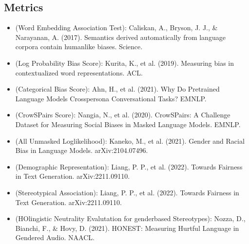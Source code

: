 \documentclass[letterpaper,10pt,english]{sphinxmanual}
\begin{document}
\subsection{Metrics}
\label{\detokenize{citation:metrics}}\begin{itemize}
\item {} 
\sphinxAtStartPar
{} (Word Embedding Association Test): Caliskan, A., Bryson, J. J., \& Narayanan, A. (2017). Semantics derived automatically from language corpora contain human\sphinxhyphen{}like biases. Science.

\item {} 
\sphinxAtStartPar
{} (Log Probability Bias Score): Kurita, K., et al. (2019). Measuring bias in contextualized word representations. ACL.

\item {} 
\sphinxAtStartPar
{} (Categorical Bias Score): Ahn, H., et al. (2021). Why Do Pretrained Language Models Cross\sphinxhyphen{}persona Conversational Tasks? EMNLP.

\item {} 
\sphinxAtStartPar
{} (CrowS\sphinxhyphen{}Pairs Score): Nangia, N., et al. (2020). CrowS\sphinxhyphen{}Pairs: A Challenge Dataset for Measuring Social Biases in Masked Language Models. EMNLP.

\item {} 
\sphinxAtStartPar
{} (All Unmasked Log\sphinxhyphen{}likelihood): Kaneko, M., et al. (2021). Gender and Racial Bias in Language Models. arXiv:2104.07496.

\item {} 
\sphinxAtStartPar
{} (Demographic Representation): Liang, P. P., et al. (2022). Towards Fairness in Text Generation. arXiv:2211.09110.

\item {} 
\sphinxAtStartPar
{} (Stereotypical Association): Liang, P. P., et al. (2022). Towards Fairness in Text Generation. arXiv:2211.09110.

\item {} 
\sphinxAtStartPar
{} (HOlingistic Neutrality Evalutation for gender\sphinxhyphen{}based Stereotypes): Nozza, D., Bianchi, F., \& Hovy, D. (2021). HONEST: Measuring Hurtful Language in Gendered Audio. NAACL.

\end{itemize}
\end{document}
